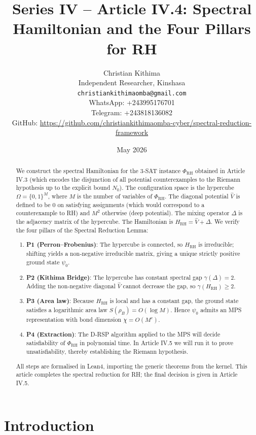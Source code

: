 \documentclass[11pt,a4paper]{article}
\title{Series IV – Article IV.4: Spectral Hamiltonian and the Four Pillars for RH}
\author{Christian Kithima \\
Independent Researcher, Kinshasa \\
\texttt{christiankithimaomba@gmail.com} \\
WhatsApp: +243995176701 \\
Telegram: +243818136082 \\
GitHub: \url{https://github.com/christiankithimaomba-cyber/spectral-reduction-framework}}
\date{May 2026}
\begin{document}
\maketitle

\begin{abstract}
We construct the spectral Hamiltonian for the 3‑SAT instance \(\Phi_{\text{RH}}\) obtained in Article IV.3 (which encodes the disjunction of all potential counterexamples to the Riemann hypothesis up to the explicit bound \(N_0\)). The configuration space is the hypercube \(\Omega = \{0,1\}^M\), where \(M\) is the number of variables of \(\Phi_{\text{RH}}\). The diagonal potential \(\hat{V}\) is defined to be \(0\) on satisfying assignments (which would correspond to a counterexample to RH) and \(M^2\) otherwise (deep potential). The mixing operator \(\Delta\) is the adjacency matrix of the hypercube. The Hamiltonian is \(H_{\text{RH}} = \hat{V} + \Delta\). We verify the four pillars of the Spectral Reduction Lemma:
\begin{enumerate}
\item \textbf{P1 (Perron–Frobenius)}: The hypercube is connected, so \(H_{\text{RH}}\) is irreducible; shifting yields a non‑negative irreducible matrix, giving a unique strictly positive ground state \(\psi_0\).
\item \textbf{P2 (Kithima Bridge)}: The hypercube has constant spectral gap \(\gamma(\Delta)=2\). Adding the non‑negative diagonal \(\hat{V}\) cannot decrease the gap, so \(\gamma(H_{\text{RH}}) \ge 2\).
\item \textbf{P3 (Area law)}: Because \(H_{\text{RH}}\) is local and has a constant gap, the ground state satisfies a logarithmic area law \(S(\rho_B)=O(\log M)\). Hence \(\psi_0\) admits an MPS representation with bond dimension \(\chi = O(M^c)\).
\item \textbf{P4 (Extraction)}: The D‑RSP algorithm applied to the MPS will decide satisfiability of \(\Phi_{\text{RH}}\) in polynomial time. In Article IV.5 we will run it to prove unsatisfiability, thereby establishing the Riemann hypothesis.
\end{enumerate}
All steps are formalised in Lean4, importing the generic theorems from the kernel. This article completes the spectral reduction for RH; the final decision is given in Article IV.5.
\end{abstract}

\tableofcontents

\section{Introduction}
\end{document}
